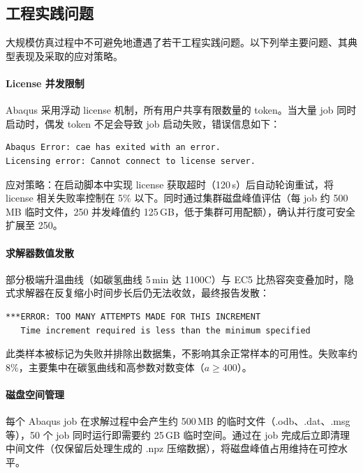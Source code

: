 \subsection{工程实践问题}

大规模仿真过程中不可避免地遭遇了若干工程实践问题。以下列举主要问题、其典型表现及采取的应对策略。

\paragraph{License 并发限制}

Abaqus 采用浮动 license 机制，所有用户共享有限数量的 token。当大量 job 同时启动时，偶发 token 不足会导致 job 启动失败，错误信息如下：

\begin{verbatim}
Abaqus Error: cae has exited with an error.
Licensing error: Cannot connect to license server.
\end{verbatim}

应对策略：在启动脚本中实现 license 获取超时（120\,s）后自动轮询重试，将 license 相关失败率控制在 5\% 以下。同时通过集群磁盘峰值评估（每 job 约 500\,MB 临时文件，250 并发峰值约 125\,GB，低于集群可用配额），确认并行度可安全扩展至 250。

\paragraph{求解器数值发散}

部分极端升温曲线（如碳氢曲线 5\,min 达 1100\textdegree C）与 EC5 比热容突变叠加时，隐式求解器在反复缩小时间步长后仍无法收敛，最终报告发散：

\begin{verbatim}
***ERROR: TOO MANY ATTEMPTS MADE FOR THIS INCREMENT
   Time increment required is less than the minimum specified
\end{verbatim}

此类样本被标记为失败并排除出数据集，不影响其余正常样本的可用性。失败率约 8\%，主要集中在碳氢曲线和高参数对数变体（$a \geq 400$）。

\paragraph{磁盘空间管理}

每个 Abaqus job 在求解过程中会产生约 500\,MB 的临时文件（.odb、.dat、.msg 等），50 个 job 同时运行即需要约 25\,GB 临时空间。通过在 job 完成后立即清理中间文件（仅保留后处理生成的 .npz 压缩数据），将磁盘峰值占用维持在可控水平。

